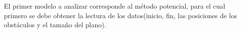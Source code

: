 \documentclass[journal, 10pt]{IEEEtran}
\begin{document}

El primer modelo a analizar corresponde al método potencial, para el cual primero se debe obtener la lectura de los datos(inicio, fin, las posiciones de los obstáculos y el tamaño del plano).
\end{document}
